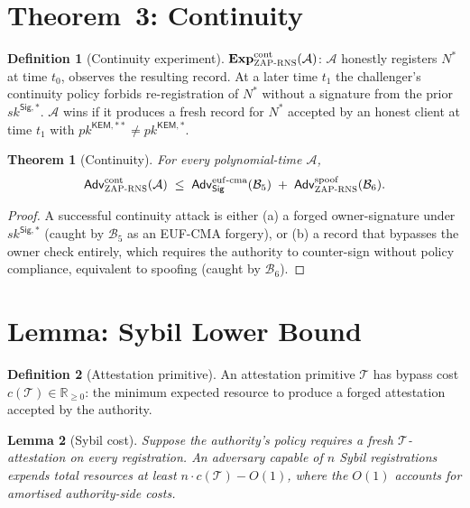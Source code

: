 \documentclass[11pt,a4paper]{article}
\newtheorem{theorem}{Theorem}
\newtheorem{lemma}[theorem]{Lemma}
\theoremstyle{definition}
\newtheorem{definition}{Definition}
\theoremstyle{remark}
\newcommand{\KEM}{\mathsf{KEM}}
\newcommand{\Sig}{\mathsf{Sig}}
\newcommand{\Adv}{\mathsf{Adv}}
\newcommand{\pk}{\mathit{pk}}
\newcommand{\sk}{\mathit{sk}}
\newcommand{\RNS}{\textsc{ZAP-RNS}}
\begin{document}
\section{Theorem~3: Continuity}

\begin{definition}[Continuity experiment]
$\mathbf{Exp}^{\mathrm{cont}}_{\RNS}(\mathcal{A})$: $\mathcal{A}$
honestly registers $N^*$ at time $t_0$, observes the resulting
record. At a later time $t_1$ the challenger's continuity policy
forbids re-registration of $N^*$ without a signature from the prior
$\sk^{\Sig,*}$. $\mathcal{A}$ wins if it produces a fresh record for
$N^*$ accepted by an honest client at time $t_1$ with
$\pk^{\KEM,**} \ne \pk^{\KEM,*}$.
\end{definition}

\begin{theorem}[Continuity]\label{thm:cont}
For every polynomial-time $\mathcal{A}$,
\[
\Adv^{\mathrm{cont}}_{\RNS}(\mathcal{A}) \;\le\;
\Adv^{\mathrm{euf\text{-}cma}}_{\Sig}(\mathcal{B}_5) \;+\;
\Adv^{\mathrm{spoof}}_{\RNS}(\mathcal{B}_6).
\]
\end{theorem}

\begin{proof}
A successful continuity attack is either (a) a forged owner-signature
under $\sk^{\Sig,*}$ (caught by $\mathcal{B}_5$ as an EUF-CMA
forgery), or (b) a record that bypasses the owner check entirely,
which requires the authority to counter-sign without policy
compliance, equivalent to spoofing (caught by $\mathcal{B}_6$).
\end{proof}

\section{Lemma: Sybil Lower Bound}

\begin{definition}[Attestation primitive]
An attestation primitive $\mathcal{T}$ has bypass cost $c(\mathcal{T})
\in \mathbb{R}_{\ge 0}$: the minimum expected resource to produce a
forged attestation accepted by the authority.
\end{definition}

\begin{lemma}[Sybil cost]\label{lem:sybil}
Suppose the authority's policy requires a fresh $\mathcal{T}$-attestation
on every registration. An adversary capable of $n$ Sybil registrations
expends total resources at least $n \cdot c(\mathcal{T}) - O(1)$,
where the $O(1)$ accounts for amortised authority-side costs.
\end{lemma}
\end{document}
